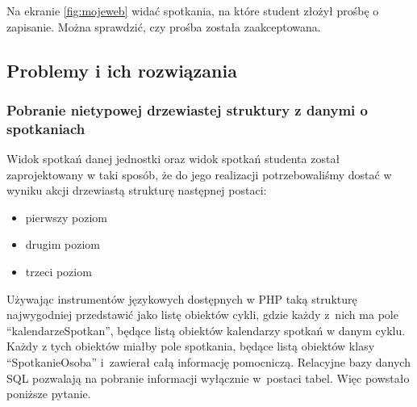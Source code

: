 \documentclass[licencjacka]{pracamgr}
\begin{document}
Na ekranie \ref{fig:mojeweb} widać spotkania, na które student złożył prośbę o zapisanie. Można sprawdzić, czy prośba została zaakceptowana.

\FloatBarrier
\subsection{Problemy i ich rozwiązania}
\subsubsection{Pobranie nietypowej drzewiastej struktury z danymi o spotkaniach}
Widok spotkań danej jednostki oraz widok spotkań studenta został zaprojektowany w taki sposób, że do jego realizacji potrzebowaliśmy dostać w wyniku akcji drzewiastą strukturę następnej postaci:

\begin{itemize}
\item{pierwszy poziom}
\item{drugim poziom}
\item{trzeci poziom}
\end{itemize}

Używając instrumentów językowych dostępnych w PHP taką strukturę najwygodniej przedstawić jako listę obiektów cykli, gdzie każdy z~nich ma pole \enquote{kalendarzeSpotkan}, będące listą obiektów kalendarzy spotkań w danym cyklu. Każdy z tych obiektów miałby pole spotkania, będące listą obiektów klasy \enquote{SpotkanieOsoba} i~zawierał całą informację pomocniczą. Relacyjne bazy danych SQL pozwalają na pobranie informacji wyłącznie w~postaci tabel. Więc powstało poniższe pytanie.
\end{document}
